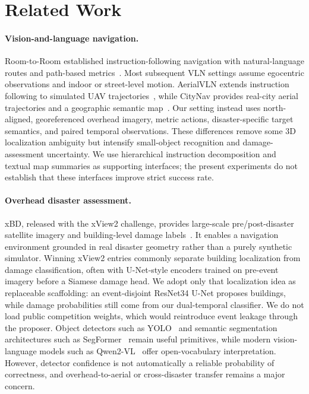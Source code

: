 \section{Related Work}
\label{sec:related}

\paragraph{Vision-and-language navigation.}
Room-to-Room established instruction-following navigation with natural-language routes and path-based metrics~\cite{anderson2018vision}.
Most subsequent VLN settings assume egocentric observations and indoor or street-level motion.
AerialVLN extends instruction following to simulated UAV trajectories~\cite{liu2023aerialvln}, while CityNav provides real-city aerial trajectories and a geographic semantic map~\cite{lee2025citynav}.
Our setting instead uses north-aligned, georeferenced overhead imagery, metric actions, disaster-specific target semantics, and paired temporal observations.
These differences remove some 3D localization ambiguity but intensify small-object recognition and damage-assessment uncertainty.
We use hierarchical instruction decomposition and textual map summaries as supporting interfaces; the present experiments do not establish that these interfaces improve strict success rate.

\paragraph{Overhead disaster assessment.}
xBD, released with the xView2 challenge, provides large-scale pre/post-disaster satellite imagery and building-level damage labels~\cite{gupta2019xbd}.
It enables a navigation environment grounded in real disaster geometry rather than a purely synthetic simulator.
Winning xView2 entries commonly separate building localization from damage classification, often with U-Net-style encoders trained on pre-event imagery before a Siamese damage head.
We adopt only that localization idea as replaceable scaffolding: an event-disjoint ResNet34 U-Net proposes buildings, while damage probabilities still come from our dual-temporal classifier.
We do not load public competition weights, which would reintroduce event leakage through the proposer.
Object detectors such as YOLO~\cite{redmon2016you} and semantic segmentation architectures such as SegFormer~\cite{xie2021segformer} remain useful primitives, while modern vision-language models such as Qwen2-VL~\cite{wang2024qwen2vl} offer open-vocabulary interpretation.
However, detector confidence is not automatically a reliable probability of correctness, and overhead-to-aerial or cross-disaster transfer remains a major concern.

